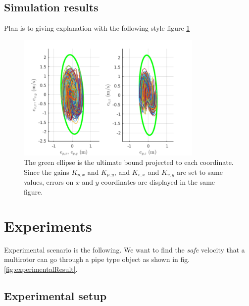 \documentclass[letterpaper, 10 pt, conference]{ieeeconf}  %
\begin{document}
\subsection{Simulation results}
Plan is to giving explanation with the following style figure \ref{fig:simulation}
\begin{figure}
\centering
\includegraphics[width=9cm]{monteCarlo.pdf}
\caption{The green ellipse is the ultimate bound projected to each coordinate. 
Since the gains $K_{p,x}$ and $K_{p,y}$, and $K_{v,x}$ and $K_{v,y}$ are set to same values, errors on $x$ and $y$ coordinates are displayed in the same figure.} \label{fig:simulation}
\end{figure}

\section{Experiments}
Experimental scenario is the following. 
We want to find the \textit{safe} velocity that a multirotor can go through a pipe type object as shown in fig. \ref{fig:experimentalResult}.

\subsection{Experimental setup}
\end{document}
